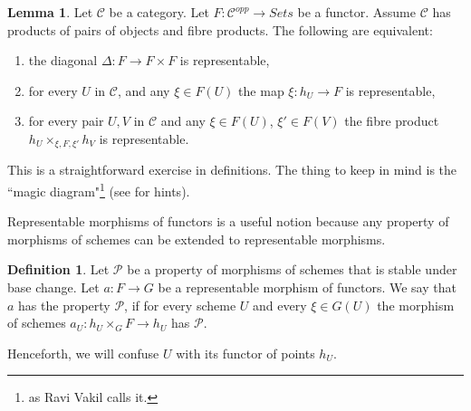 \documentclass[11pt]{amsart}
\theoremstyle{definition}
\newtheorem{lemma}[theorem]{Lemma}
\newtheorem{definition}[theorem]{Definition}
\begin{document}
\begin{lemma}
	\label{lemma-representable-diagonal}
	Let $\mathcal{C}$ be a category.
	Let $F : \mathcal{C}^{opp} \to \textit{Sets}$ be a functor.
	Assume $\mathcal{C}$ has products of pairs of objects and fibre products.
	The following are equivalent:
	\begin{enumerate}
		\item the diagonal $\Delta : F \to F \times F$ is representable,
		\item for every $U$ in $\mathcal{C}$,
		and any $\xi \in F(U)$ the map $\xi : h_U \to F$ is representable,
		\item for every pair $U, V$ in $\mathcal{C}$
		and any $\xi \in F(U)$, $\xi' \in F(V)$ the fibre product
		$h_U \times_{\xi, F, \xi'} h_V$ is representable.
	\end{enumerate}
\end{lemma}
This is a straightforward exercise in definitions. The thing to keep in mind is the ``magic diagram"\footnote{as Ravi Vakil calls it.} (see \cite[Tag 0024]{stacks-project} for hints).

Representable morphisms of functors is a useful notion because any property of morphisms of schemes can be extended to representable morphisms.

\begin{definition}
	Let $\mathcal{P}$ be a property of morphisms of schemes that is stable under base change. Let $a: F\rightarrow G$ be a representable morphism of functors. We say that $a$ has the property $\mathcal{P}$, if for every scheme $U$ and every $\xi\in G(U)$ the morphism of schemes $a_U: h_U\times_G F\rightarrow h_U$ has $\mathcal{P}$. 
\end{definition}

Henceforth, we will confuse $U$ with its functor of points $h_U$.
\end{document}
